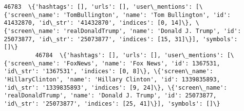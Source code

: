 \documentclass[11pt]{article}
\begin{document}
\begin{Verbatim}[commandchars=\\\{\}]
         46783  \{'hashtags': [], 'urls': [], 'user\_mentions': [\{'screen\_name': 'TomBullington', 'name': 'Tom Bullington', 'id': 41432870, 'id\_str': '41432870', 'indices': [0, 14]\}, \{'screen\_name': 'realDonaldTrump', 'name': 'Donald J. Trump', 'id': 25073877, 'id\_str': '25073877', 'indices': [15, 31]\}], 'symbols': []\}                                                                                                                                                                                                                                                                                                                                                                                                                                                                                                                                                                                                                                                                                                                                                                                                                                                                                                 
         46784  \{'hashtags': [], 'urls': [], 'user\_mentions': [\{'screen\_name': 'FoxNews', 'name': 'Fox News', 'id': 1367531, 'id\_str': '1367531', 'indices': [0, 8]\}, \{'screen\_name': 'HillaryClinton', 'name': 'Hillary Clinton', 'id': 1339835893, 'id\_str': '1339835893', 'indices': [9, 24]\}, \{'screen\_name': 'realDonaldTrump', 'name': 'Donald J. Trump', 'id': 25073877, 'id\_str': '25073877', 'indices': [25, 41]\}], 'symbols': []\}                                                                                                                                                                                                                                                                                                                                                                                                                                                                                                                                                                                                                                                                                                                                                                                    

\end{Verbatim}
\end{document}
